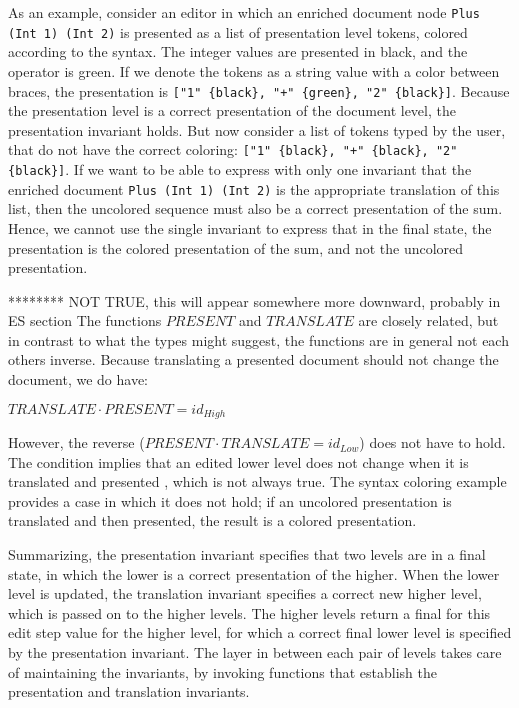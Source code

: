 As an example, consider an editor in which an enriched document node \verb|Plus (Int 1) (Int 2)| is presented as a list of presentation level tokens, colored according to the syntax. The integer values are presented in black, and the operator is green. If we denote the tokens as a string value with a color between braces, the presentation is \verb|["1" {black}, "+" {green}, "2" {black}]|. Because the presentation level is a correct presentation of the document level, the presentation invariant holds. But now consider a list of tokens typed by the user, that do not have the correct coloring: \verb|["1" {black}, "+" {black}, "2" {black}]|. If we want to be able to express with only one invariant that the enriched document \verb|Plus (Int 1) (Int 2)| is the appropriate translation of this list, then the uncolored sequence must also be a correct presentation of the sum. Hence, we cannot use the single invariant to express that in the final state, the presentation is the colored presentation of the sum, and not the uncolored presentation. 


******** NOT TRUE, this will appear somewhere more downward, probably in ES section
The functions $PRESENT$ and $TRANSLATE$ are closely related, but in contrast to what the types might suggest, the functions are in general not each others inverse. Because translating a presented document should not change the document, we do have: 

\begin{math}
TRANSLATE \cdot PRESENT = id_{High}
\end{math}


However, the reverse ($PRESENT \cdot TRANSLATE = id_{Low}$) does not have to hold. The condition implies that an edited lower level does not change when it is translated and presented , which is not always true. The syntax coloring example provides a case in which it does not hold; if an uncolored presentation is translated and then presented, the result is a colored presentation. 

Summarizing, the presentation invariant specifies that two levels are in a final state, in which the lower is a correct presentation of the higher. When the lower level is updated, the translation invariant specifies a correct new higher level, which is passed on to the higher levels. The higher levels return a final for this edit step value for the higher level, for which a correct final lower level is specified by the presentation invariant. The layer in between each pair of levels takes care of maintaining the invariants, by invoking functions that establish the presentation and translation invariants.

